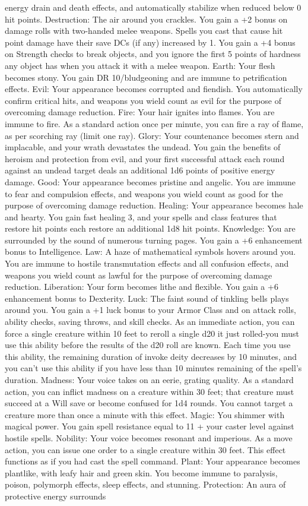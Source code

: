 energy drain and death effects, and automatically stabilize when reduced below 0 hit points.  Destruction: The air around you crackles. You gain a +2 bonus on damage rolls with two-handed melee weapons. Spells you cast that cause hit point damage have their save DCs (if any) increased by 1. You gain a +4 bonus on Strength checks to break objects, and you ignore the first 5 points of hardness any object has when you attack it with a melee weapon.  Earth: Your flesh becomes stony. You gain DR 10/bludgeoning and are immune to petrification effects.  Evil: Your appearance becomes corrupted and fiendish. You automatically confirm critical hits, and weapons you wield count as evil for the purpose of overcoming damage reduction.  Fire: Your hair ignites into flames. You are immune to fire. As a standard action once per minute, you can fire a ray of flame, as per scorching ray (limit one ray).  Glory: Your countenance becomes stern and implacable, and your wrath devastates the undead. You gain the benefits of heroism and protection from evil, and your first successful attack each round against an undead target deals an additional 1d6 points of positive energy damage.  Good: Your appearance becomes pristine and angelic. You are immune to fear and compulsion effects, and weapons you wield count as good for the purpose of overcoming damage reduction.  Healing: Your appearance becomes hale and hearty. You gain fast healing 3, and your spells and class features that restore hit points each restore an additional 1d8 hit points.  Knowledge: You are surrounded by the sound of numerous turning pages. You gain a +6 enhancement bonus to Intelligence.  Law: A haze of mathematical symbols hovers around you. You are immune to hostile transmutation effects and all confusion effects, and weapons you wield count as lawful for the purpose of overcoming damage reduction.  Liberation: Your form becomes lithe and flexible. You gain a +6 enhancement bonus to Dexterity.  Luck: The faint sound of tinkling bells plays around you. You gain a +1 luck bonus to your Armor Class and on attack rolls, ability checks, saving throws, and skill checks. As an immediate action, you can force a single creature within 10 feet to reroll a single d20 it just rolled-you must use this ability before the results of the d20 roll are known. Each time you use this ability, the remaining duration of invoke deity decreases by 10 minutes, and you can't use this ability if you have less than 10 minutes remaining of the spell's duration.  Madness: Your voice takes on an eerie, grating quality. As a standard action, you can inflict madness on a creature within 30 feet; that creature must succeed at a Will save or become confused for 1d4 rounds. You cannot target a creature more than once a minute with this effect.  Magic: You shimmer with magical power. You gain spell resistance equal to 11 + your caster level against hostile spells.  Nobility: Your voice becomes resonant and imperious. As a move action, you can issue one order to a single creature within 30 feet. This effect functions as if you had cast the spell command.  Plant: Your appearance becomes plantlike, with leafy hair and green skin. You become immune to paralysis, poison, polymorph effects, sleep effects, and stunning.  Protection: An aura of protective energy surrounds 